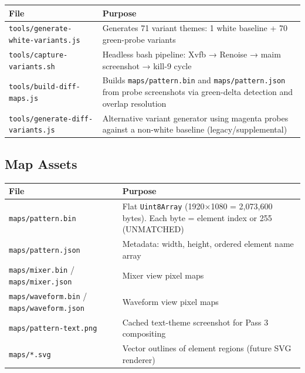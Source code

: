 \documentclass[
  11pt,
  oneside]{report}
\begin{document}
\begin{longtable}[]{@{}
  >{\raggedright\arraybackslash}p{}
  >{\raggedright\arraybackslash}p{}@{}}
\toprule\noalign{}
\begin{minipage}[b]{\linewidth}\raggedright
File
\end{minipage} & \begin{minipage}[b]{\linewidth}\raggedright
Purpose
\end{minipage} \\
\midrule\noalign{}
\endhead
\bottomrule\noalign{}
\endlastfoot
\texttt{tools/generate-white-variants.js} & Generates 71 variant themes:
1 white baseline + 70 green-probe variants \\
\texttt{tools/capture-variants.sh} & Headless bash pipeline: Xvfb →
Renoise → maim screenshot → kill-9 cycle \\
\texttt{tools/build-diff-maps.js} & Builds \texttt{maps/pattern.bin} and
\texttt{maps/pattern.json} from probe screenshots via green-delta
detection and overlap resolution \\
\texttt{tools/generate-diff-variants.js} & Alternative variant generator
using magenta probes against a non-white baseline
(legacy/supplemental) \\
\end{longtable}

\subsection{Map Assets}\label{map-assets}

\begin{longtable}[]{@{}
  >{\raggedright\arraybackslash}p{}
  >{\raggedright\arraybackslash}p{}@{}}
\toprule\noalign{}
\begin{minipage}[b]{\linewidth}\raggedright
File
\end{minipage} & \begin{minipage}[b]{\linewidth}\raggedright
Purpose
\end{minipage} \\
\midrule\noalign{}
\endhead
\bottomrule\noalign{}
\endlastfoot
\texttt{maps/pattern.bin} & Flat \texttt{Uint8Array} (1920×1080 =
2,073,600 bytes). Each byte = element index or 255 (UNMATCHED) \\
\texttt{maps/pattern.json} & Metadata: width, height, ordered element
name array \\
\texttt{maps/mixer.bin} / \texttt{maps/mixer.json} & Mixer view pixel
maps \\
\texttt{maps/waveform.bin} / \texttt{maps/waveform.json} & Waveform view
pixel maps \\
\texttt{maps/pattern-text.png} & Cached text-theme screenshot for Pass 3
compositing \\
\texttt{maps/*.svg} & Vector outlines of element regions (future SVG
renderer) \\
\end{longtable}
\end{document}
